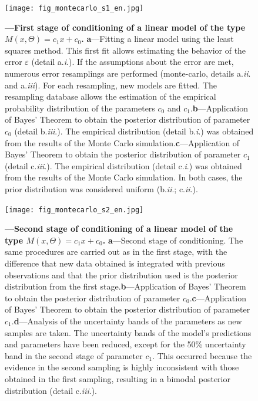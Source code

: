 \documentclass[./main_en.tex]{subfiles}
\begin{document}
\begin{figure}[t!] %
	\centering				
	\texttt{[image: fig\_montecarlo\_s1\_en.jpg]}		
	\caption[First stage of \gls{conditioning} of a linear \gls{model}]
	{\textbf{---\;First stage of \gls{conditioning} of a linear \gls{model} of the type $M(x, \Theta) = c_{1}x + c_{0}$.}
        \;\textbf{a}\;---\;Fitting a linear \gls{model} using the least squares method. This first fit allows estimating the behavior of the error $\varepsilon$ (detail a.\textit{\textrm{i}}.). If the assumptions about the error are met, numerous error resamplings are performed (\gls{monte-carlo}, details a.\textit{\textrm{ii}}. and a.\textit{\textrm{iii}}). For each resampling, new models are fitted. The resampling database allows the estimation of the empirical probability distribution of the parameters $c_0$ and $c_1$.\;\textbf{b}\;---\;Application of Bayes' Theorem to obtain the posterior distribution of parameter $c_0$ (detail b.\textit{\textrm{iii}}.). The empirical distribution (detail b.\textit{\textrm{i}}.) was obtained from the results of the Monte Carlo simulation.\;\textbf{c}\;---\;Application of Bayes' Theorem to obtain the posterior distribution of parameter $c_1$ (detail c.\textit{\textrm{iii}}.). The empirical distribution (detail c.\textit{\textrm{i}}.) was obtained from the results of the Monte Carlo simulation. In both cases, the prior distribution was considered uniform (b.\textit{\textrm{ii}}.; c.\textit{\textrm{ii}}.).
	}
\label{fig:bayes_s1}  %
\end{figure}

\begin{figure}[t!] %
	\centering				
	\texttt{[image: fig\_montecarlo\_s2\_en.jpg]}		
	\caption[Second stage of \gls{conditioning} of a linear \gls{model}]
	{\textbf{---\;Second stage of \gls{conditioning} of a linear \gls{model} of the type $M(x, \Theta) = c_{1}x + c_{0}$.}
        \;\textbf{a}\;---\;Second stage of \gls{conditioning}. The same procedures are carried out as in the first stage, with the difference that new data obtained is integrated with previous observations and that the prior distribution used is the posterior distribution from the first stage.\;\textbf{b}\;---\;Application of Bayes' Theorem to obtain the posterior distribution of parameter $c_0$.\;\textbf{c}\;---\;Application of Bayes' Theorem to obtain the posterior distribution of parameter $c_1$.\;\textbf{d}\;---\;Analysis of the uncertainty bands of the parameters as new samples are taken. The uncertainty bands of the model's predictions and parameters have been reduced, except for the 50\% uncertainty band in the second stage of parameter $c_1$. This occurred because the evidence in the second sampling is highly inconsistent with those obtained in the first sampling, resulting in a bimodal posterior distribution (detail c.\textit{\textrm{iii}}.).
	}
\label{fig:bayes_s2}  %
\end{figure}
\end{document}
